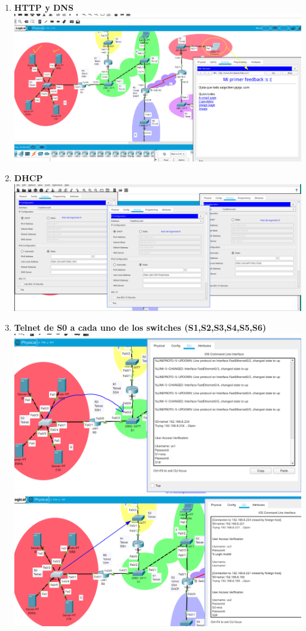 \documentclass{article}
\begin{document}
\begin{enumerate}[label=\textbf{\arabic*.}]
  \item \textbf{HTTP y DNS}\\[5mm]
  \includegraphics[width=\linewidth]{web-dns-ev01.png}
  \newpage
  \item \textbf{DHCP}\\[5mm]
  \includegraphics[width=\linewidth]{dhcp-ev01.png}
  \item \textbf{Telnet de S0 a cada uno de los switches (S1,S2,S3,S4,S5,S6)}
  \\
  \includegraphics[width=0.8\linewidth]{telnet-s0-s1.png}\\[3mm]
  \includegraphics[width=0.8\linewidth]{telnet-s0-s2.png}\\[3mm]

\end{enumerate}
\end{document}
